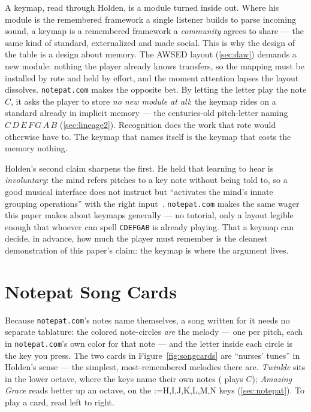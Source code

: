 \documentclass[10pt,letterpaper,twocolumn]{article}
\makeatletter
\DeclareRobustCommand{\key}[1]{\tikz[baseline=(k.base)]{%
 \node[fill=keystroke, rounded corners=1.3pt, inner xsep=2.4pt,
    inner ysep=1.9pt, anchor=base, yshift=-1.2pt] at (0,0)
  {\footnotesize\ttfamily\bfseries\vphantom{A}\phantom{#1}};
 \node[draw=keystroke, line width=0.4pt, fill=keyfill,
    rounded corners=1.3pt, inner xsep=2.4pt, inner ysep=1.9pt,
    anchor=base] (k) at (0,0)
  {\footnotesize\ttfamily\bfseries\vphantom{A}#1};}}
\DeclareRobustCommand{\keys}[1]{{\def\sep{}\@for\kk:=#1\do{\sep\key{\kk}\def\sep{\,}}}}
\makeatother
\begin{document}
A keymap, read through Holden, is a module turned inside out. Where his module is the remembered framework a single listener builds to parse incoming sound, a keymap is a remembered framework a \emph{community} agrees to share --- the same kind of standard, externalized and made social. This is why the design of the table is a design about memory. The AWSED layout (\textsection\ref{sec:daw}) demands a new module: nothing the player already knows transfers, so the mapping must be installed by rote and held by effort, and the moment attention lapses the layout dissolves. \texttt{notepat.com} makes the opposite bet. By letting the letter \key{C} play the note $C$, it asks the player to store \emph{no new module at all}: the keymap rides on a standard already in implicit memory --- the centuries-old pitch-letter naming $C\,D\,E\,F\,G\,A\,B$ (\textsection\ref{sec:lineage2}). Recognition does the work that rote would otherwise have to. The keymap that names itself is the keymap that costs the memory nothing.

Holden's second claim sharpens the first. He held that learning to hear is \emph{involuntary}: the mind refers pitches to a key note without being told to, so a good musical interface does not instruct but ``activates the mind's innate grouping operations'' with the right input~\citep{raz2025}. \texttt{notepat.com} makes the same wager this paper makes about keymaps generally --- no tutorial, only a layout legible enough that whoever can spell \texttt{CDEFGAB} is already playing. That a keymap can decide, in advance, how much the player must remember is the cleanest demonstration of this paper's claim: the keymap is where the argument lives.

\section{Notepat Song Cards}
\label{app:songs}

Because \texttt{notepat.com}'s notes name themselves, a song written for it needs no separate tablature: the colored note-circles \emph{are} the melody --- one per pitch, each in \texttt{notepat.com}'s own color for that note --- and the letter inside each circle is the key you press. The two cards in Figure~\ref{fig:songcards} are ``nurses' tunes'' in Holden's sense --- the simplest, most-remembered melodies there are. \emph{Twinkle} sits in the lower octave, where the keys name their own notes (\key{C} plays $C$); \emph{Amazing Grace} reads better up an octave, on the \keys{H,I,J,K,L,M,N} keys (\textsection\ref{sec:notepat}). To play a card, read left to right.
\end{document}
